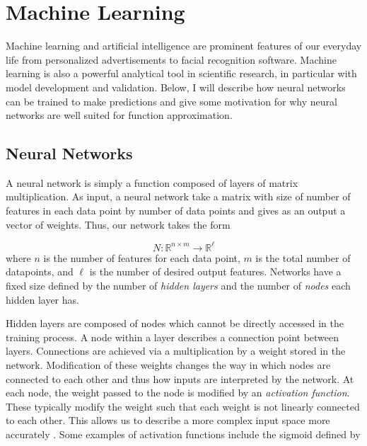 \documentclass{CUP-JNL-DTM}%
\theoremstyle{definition}
\numberwithin{equation}{section}
\begin{document}

\section{Machine Learning}

Machine learning and artificial intelligence are prominent features of our everyday life from personalized advertisements to facial recognition software. Machine learning is also a powerful analytical tool in scientific research, in particular with model development and validation. Below, I will describe how neural networks can be trained to make predictions and give some motivation for why neural networks are well suited for function approximation. 


\subsection{Neural Networks}

A neural network is simply a function composed of layers of matrix multiplication. As input, a neural network take a matrix with size of number of features in each data point by number of data points and gives as an output a vector of weights. Thus, our network takes the form

\begin{equation}
    N : \mathbb{R}^{n\times m} \rightarrow \mathbb{R}^{\ell}
\end{equation}
where $n$ is the number of features for each data point, $m$ is the total number of datapoints, and $\ell$ is the number of desired output features. Networks have a fixed size defined by the number of \emph{hidden layers} and the number of \emph{nodes} each hidden layer has. 

Hidden layers are composed of nodes which cannot be directly accessed in the training process. A node within a layer describes a connection point between layers. Connections are achieved via a multiplication by a weight stored in the network. Modification of these weights changes the way in which nodes are connected to each other and thus how inputs are interpreted by the network. At each node, the weight passed to the node is modified by an \emph{activation function}. These typically modify the weight such that each weight is not linearly connected to each other. This allows us to describe a more complex input space more accurately \cite{dubeyActivationFunctionsDeep2022a}. Some examples of activation functions include the sigmoid defined by 
\end{document}
